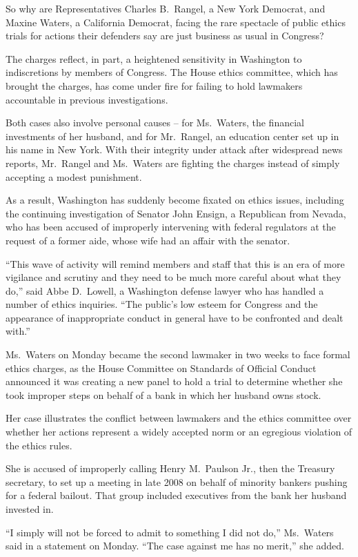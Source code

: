 ﻿\documentclass[12pt]{article}
\begin{document}
So why are Representatives Charles B.~Rangel, a New York Democrat, and Maxine Waters, a California
Democrat, facing the rare spectacle of public ethics trials for actions their defenders say are just
business as usual in Congress?

The charges reflect, in part, a heightened sensitivity in Washington to indiscretions by members of
Congress. The House ethics committee, which has brought the charges, has come under fire for failing
to hold lawmakers accountable in previous investigations.

Both cases also involve personal causes -- for Ms.~Waters, the financial investments of her husband,
and for Mr.~Rangel, an education center set up in his name in New York. With their integrity under
attack after widespread news reports, Mr.~Rangel and Ms.~Waters are fighting the charges instead of
simply accepting a modest punishment.

As a result, Washington has suddenly become fixated on ethics issues, including the continuing
investigation of Senator John Ensign, a Republican from Nevada, who has been accused of improperly
intervening with federal regulators at the request of a former aide, whose wife had an affair with
the senator.

``This wave of activity will remind members and staff that this is an era of more vigilance and
scrutiny and they need to be much more careful about what they do,'' said Abbe D.~Lowell, a
Washington defense lawyer who has handled a number of ethics inquiries. ``The public's low esteem
for Congress and the appearance of inappropriate conduct in general have to be confronted and dealt
with.''

Ms.~Waters on Monday became the second lawmaker in two weeks to face formal ethics charges, as the
House Committee on Standards of Official Conduct announced it was creating a new panel to hold a
trial to determine whether she took improper steps on behalf of a bank in which her husband owns
stock.

Her case illustrates the conflict between lawmakers and the ethics committee over whether her
actions represent a widely accepted norm or an egregious violation of the ethics rules.

She is accused of improperly calling Henry M.~Paulson Jr., then the Treasury secretary, to set up a
meeting in late 2008 on behalf of minority bankers pushing for a federal bailout. That group
included executives from the bank her husband invested in.

``I simply will not be forced to admit to something I did not do,'' Ms.~Waters said in a statement
on Monday. ``The case against me has no merit,'' she added.
\end{document}
